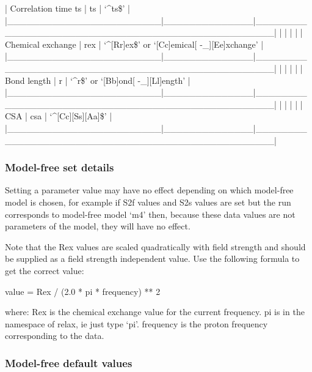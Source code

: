 | Correlation time ts    | ts           | `\^{}ts\$'                                           |
|\_\_\_\_\_\_\_\_\_\_\_\_\_\_\_\_\_\_\_\_\_\_\_\_|\_\_\_\_\_\_\_\_\_\_\_\_\_\_|\_\_\_\_\_\_\_\_\_\_\_\_\_\_\_\_\_\_\_\_\_\_\_\_\_\_\_\_\_\_\_\_\_\_\_\_\_\_\_\_\_\_\_\_\_\_\_\_\_\_|
|                        |              |                                                  |
| Chemical exchange      | rex          | `\^{}[Rr]ex\$' or `[Cc]emical[ -\_][Ee]xchange'       |
|\_\_\_\_\_\_\_\_\_\_\_\_\_\_\_\_\_\_\_\_\_\_\_\_|\_\_\_\_\_\_\_\_\_\_\_\_\_\_|\_\_\_\_\_\_\_\_\_\_\_\_\_\_\_\_\_\_\_\_\_\_\_\_\_\_\_\_\_\_\_\_\_\_\_\_\_\_\_\_\_\_\_\_\_\_\_\_\_\_|
|                        |              |                                                  |
| Bond length            | r            | `\^{}r\$' or `[Bb]ond[ -\_][Ll]ength'                 |
|\_\_\_\_\_\_\_\_\_\_\_\_\_\_\_\_\_\_\_\_\_\_\_\_|\_\_\_\_\_\_\_\_\_\_\_\_\_\_|\_\_\_\_\_\_\_\_\_\_\_\_\_\_\_\_\_\_\_\_\_\_\_\_\_\_\_\_\_\_\_\_\_\_\_\_\_\_\_\_\_\_\_\_\_\_\_\_\_\_|
|                        |              |                                                  |
| CSA                    | csa          | `\^{}[Cc][Ss][Aa]\$'                                 |
|\_\_\_\_\_\_\_\_\_\_\_\_\_\_\_\_\_\_\_\_\_\_\_\_|\_\_\_\_\_\_\_\_\_\_\_\_\_\_|\_\_\_\_\_\_\_\_\_\_\_\_\_\_\_\_\_\_\_\_\_\_\_\_\_\_\_\_\_\_\_\_\_\_\_\_\_\_\_\_\_\_\_\_\_\_\_\_\_\_|



\subsubsection{Model-free set details}

Setting a parameter value may have no effect depending on which model-free model is chosen,
for example if S2f values and S2s values are set but the run corresponds to model-free model
`m4' then, because these data values are not parameters of the model, they will have no
effect.

Note that the Rex values are scaled quadratically with field strength and should be supplied
as a field strength independent value.  Use the following formula to get the correct value:

    value = Rex / (2.0 * pi * frequency) ** 2

where:
    Rex is the chemical exchange value for the current frequency.
    pi is in the namespace of relax, ie just type `pi'.
    frequency is the proton frequency corresponding to the data.


\subsubsection{Model-free default values}



